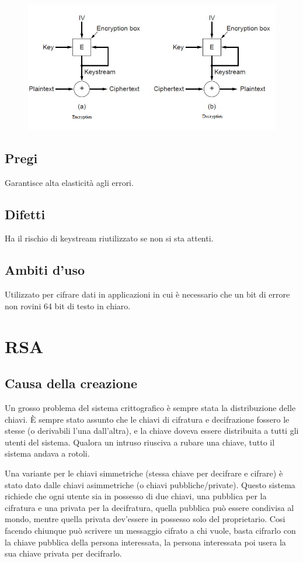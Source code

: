 \begin{figure}[H]
\centering
\includegraphics[scale=0.6]{res/img/56_StreamCipher.png}
\end{figure} 

\subsection{Pregi}
Garantisce alta elasticità agli errori.
\subsection{Difetti}
Ha il rischio di keystream riutilizzato se non si sta attenti.
\subsection{Ambiti d'uso}
Utilizzato per cifrare dati in applicazioni in cui è necessario che un bit di errore non rovini 64 bit di testo in chiaro.

\section{RSA}
\subsection{Causa della creazione}
Un grosso problema del sistema crittografico è sempre stata la distribuzione delle chiavi. 
È sempre stato assunto che le chiavi di cifratura e decifrazione fossero le stesse (o derivabili l’una dall’altra), e la chiave doveva essere distribuita a tutti gli utenti del sistema. Qualora un intruso riusciva a rubare una chiave, tutto il sistema andava a rotoli.

Una variante per le chiavi simmetriche (stessa chiave per decifrare e cifrare) è stato dato dalle chiavi asimmetriche (o chiavi pubbliche/private).
Questo sistema richiede che ogni utente sia in possesso di due chiavi, una pubblica per la cifratura e una privata per la decifratura, quella pubblica può essere condivisa al mondo, mentre quella privata dev’essere in possesso solo del proprietario.
Cosi facendo chiunque può scrivere un messaggio cifrato a chi vuole, basta cifrarlo con la chiave pubblica della persona interessata, la persona interessata poi usera la sua chiave privata per decifrarlo.

